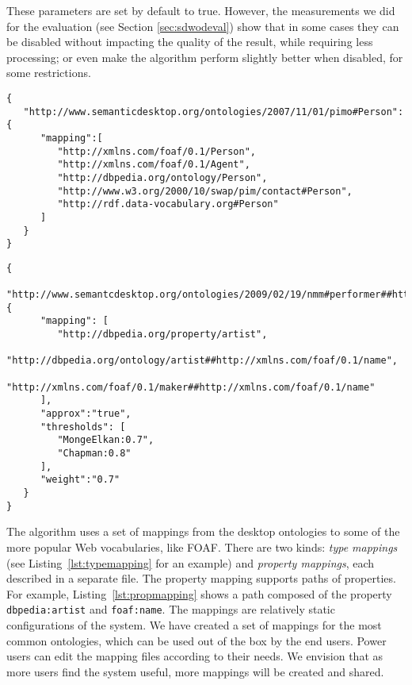 These parameters are set by default to true. However, the measurements we did for the evaluation (see Section \ref{sec:sdwodeval}) show that in some cases they can be disabled without impacting the quality of the result, while requiring less processing; or even make the algorithm perform slightly better when disabled, for some restrictions.

\setlength\parindent{0in}
\begin{minipage}[htb]{\linewidth}
\begin{lstlisting}
{
   "http://www.semanticdesktop.org/ontologies/2007/11/01/pimo#Person": {
      "mapping":[
         "http://xmlns.com/foaf/0.1/Person",
         "http://xmlns.com/foaf/0.1/Agent",
         "http://dbpedia.org/ontology/Person",
         "http://www.w3.org/2000/10/swap/pim/contact#Person",
         "http://rdf.data-vocabulary.org#Person" 
      ]
   }
}
\end{lstlisting}
\end{minipage}
\setlength\parindent{0.21in}

\setlength\parindent{0in}
\begin{minipage}[htb]{\linewidth}
\begin{lstlisting}
{
   "http://www.semantcdesktop.org/ontologies/2009/02/19/nmm#performer##http://www.semanticdesktop.org/ontologies/2007/03/22/nco#fullname": {
      "mapping": [
         "http://dbpedia.org/property/artist",
         "http://dbpedia.org/ontology/artist##http://xmlns.com/foaf/0.1/name",
         "http://xmlns.com/foaf/0.1/maker##http://xmlns.com/foaf/0.1/name"
      ],
      "approx":"true",
      "thresholds": [
         "MongeElkan:0.7",
         "Chapman:0.8"
      ],
      "weight":"0.7" 
   }
}
\end{lstlisting}
\end{minipage}
\setlength\parindent{0.21in}

The algorithm uses a set of mappings from the desktop ontologies to some of the more popular Web vocabularies, like FOAF. There are two kinds: \emph{type mappings} (see Listing~\ref{lst:typemapping} for an example) and \emph{property mappings}, each described in a separate file. The property mapping supports paths of properties. For example,  Listing~\ref{lst:propmapping} shows a path composed of the property \texttt{dbpedia:artist} and \texttt{foaf:name}. The mappings are relatively static configurations of the system. We have created a set of mappings for the most common ontologies, which can be used out of the box by the end users. Power users can edit the mapping files according to their needs. We envision that as more users find the system useful, more mappings will be created and shared.

